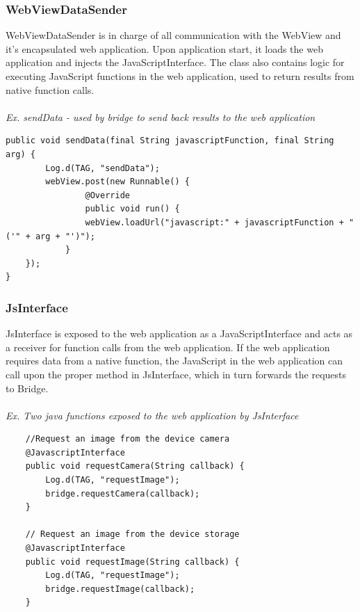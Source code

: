 \subsubsection{WebViewDataSender}
WebViewDataSender is in charge of all communication with the WebView and it's encapsulated web application. Upon application start, it loads the web application and injects the JavaScriptInterface. The class also contains logic for executing JavaScript functions in the web application, used to return results from native function calls.
\\\\
\emph{Ex. sendData - used by bridge to send back results to the web application}
\begin{lstlisting}
public void sendData(final String javascriptFunction, final String arg) {
        Log.d(TAG, "sendData");
        webView.post(new Runnable() {
            	@Override
            	public void run() {
        		webView.loadUrl("javascript:" + javascriptFunction + "('" + arg + "')");
    		}
	});
}
\end{lstlisting}
	
\subsubsection{JsInterface} \label{subsubsec:jsinterface}
JsInterface is exposed to the web application as a JavaScriptInterface and acts as a receiver for function calls from the web application. If the web application requires data from a native function, the JavaScript in the web application can call upon the proper method in JsInterface, which in turn forwards the requests to Bridge.
\\\\
\emph{Ex. Two java functions exposed to the web application by JsInterface}
\begin{lstlisting}
    //Request an image from the device camera
    @JavascriptInterface
    public void requestCamera(String callback) {
        Log.d(TAG, "requestImage");
        bridge.requestCamera(callback);
    }

    // Request an image from the device storage
    @JavascriptInterface
    public void requestImage(String callback) {
        Log.d(TAG, "requestImage");
        bridge.requestImage(callback);
    }
\end{lstlisting}

	
